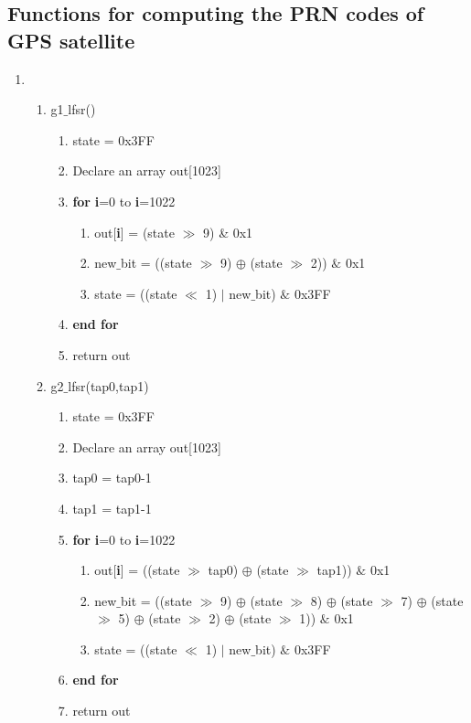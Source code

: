 \documentclass[journal,10pt,onecolumn]{article}
\begin{document}
\subsection{Functions for computing the PRN codes of GPS satellite}
\begin{enumerate}
    \item 
    \begin{enumerate}
    \item g1$\_$lfsr()
    \begin{enumerate}
    \item[] state = 0x3FF
    \item[] Declare an array out[1023]
    \item[] \textbf{for} \textbf{i}=0 to \textbf{i}=1022
        \begin{enumerate}
            \item[] out[\textbf{i}] = (state $\gg$ 9) \& 0x1 
            \item[] new$\_$bit = ((state $\gg$ 9) $\oplus$ (state $\gg$ 2)) $\&$ 0x1
            \item[] state = ((state $\ll$ 1) $\vert$  new$\_$bit) $\&$ 0x3FF
        \end{enumerate}
    \item[] \textbf{end for}
    \item[] return out
    \end{enumerate}
    
    

    \item g2$\_$lfsr(tap0,tap1)
    \begin{enumerate}
        \item[] state = 0x3FF
        \item[] Declare an array out[1023]
        \item[] tap0 = tap0-1
        \item[] tap1 = tap1-1 
        \item[] \textbf{for} \textbf{i}=0 to \textbf{i}=1022
        \begin{enumerate}
            \item[] out[\textbf{i}] = ((state $\gg$ tap0) $\oplus$ (state $\gg$ tap1)) $\&$ 0x1
            \item[] new$\_$bit =  ((state $\gg$ 9) $\oplus$ (state $\gg$ 8) $\oplus$
            (state $\gg$ 7) $\oplus$ (state $\gg$ 5) $\oplus$
            (state $\gg$ 2) $\oplus$ (state $\gg$ 1)) $\&$ 0x1
            \item[] state = ((state $\ll$ 1) $\vert$ new$\_$bit) $\&$ 0x3FF
        \end{enumerate}
        \item[] \textbf{end for}
        \item[] return out
    \end{enumerate}
    





\end{enumerate}
\end{enumerate}
\end{document}
